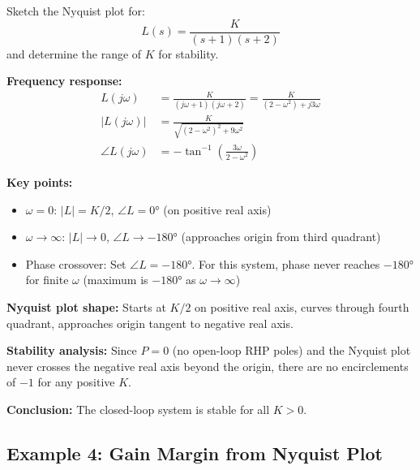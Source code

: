 \begin{example}
\label{ex:nyquist_sketch}
Sketch the Nyquist plot for:
\begin{equation}
L(s) = \frac{K}{(s+1)(s+2)}
\end{equation}
and determine the range of $K$ for stability.

\textbf{Frequency response:}
\begin{align}
L(j\omega) &= \frac{K}{(j\omega+1)(j\omega+2)} = \frac{K}{(2-\omega^2) + j3\omega} \\
|L(j\omega)| &= \frac{K}{\sqrt{(2-\omega^2)^2 + 9\omega^2}} \\
\angle L(j\omega) &= -\tan^{-1}\left(\frac{3\omega}{2-\omega^2}\right)
\end{align}

\textbf{Key points:}
\begin{itemize}
    \item $\omega = 0$: $|L| = K/2$, $\angle L = 0°$ (on positive real axis)
    \item $\omega \to \infty$: $|L| \to 0$, $\angle L \to -180°$ (approaches origin from third quadrant)
    \item Phase crossover: Set $\angle L = -180°$. For this system, phase never reaches $-180°$ for finite $\omega$ (maximum is $-180°$ as $\omega \to \infty$)
\end{itemize}

\textbf{Nyquist plot shape:} Starts at $K/2$ on positive real axis, curves through fourth quadrant, approaches origin tangent to negative real axis.

\textbf{Stability analysis:} Since $P = 0$ (no open-loop RHP poles) and the Nyquist plot never crosses the negative real axis beyond the origin, there are no encirclements of $-1$ for any positive $K$.

\textbf{Conclusion:} The closed-loop system is stable for all $K > 0$.
\end{example}

\subsection{Example 4: Gain Margin from Nyquist Plot}

